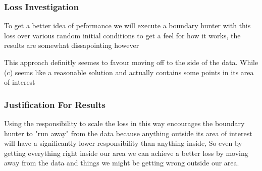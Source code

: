 \documentclass{article}
\begin{document}
\subsubsection{Loss Investigation}
To get a better idea of peformance we will execute a boundary hunter with this loss over various random initial conditions to get a feel for how it works, the results are somewhat dissapointing however

\begin{figure}[H]
\centering
  \hfill
\hfill
{}
\end{figure}

This approach definitly seemes to favour moving off to the side of the data. While (c) seems like a reasonable solution and actually contains some points in its area of interest

\subsubsection{Justification For Results}
Using the responsibility to scale the loss in this way encourages the boundary hunter to "run away" from the data because anything outside its area of interest will have a significantly lower responsibility than anything inside, So even by getting everything right inside our area we can achieve a better loss by moving away from the data and things we might be getting wrong outside our area.
\end{document}

